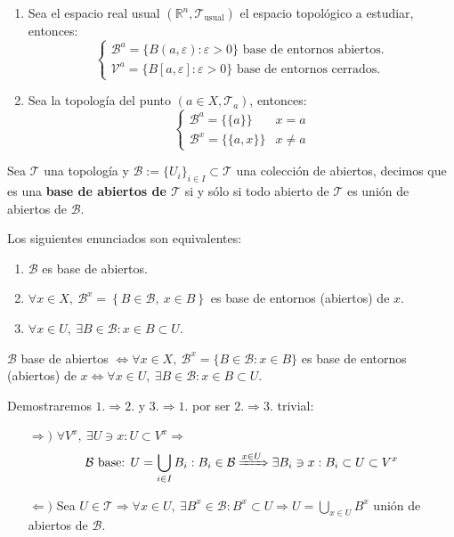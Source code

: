 \begin{ej}
\begin{enumerate}
    \item Sea el espacio real usual $(\mathbb{R}^n, \mathcal{T}_{\text{usual}})$ el espacio topológico a estudiar, entonces:
    $$
    \begin{cases}
    \mathcal{B}^a = \{B\left( a, \varepsilon \right): \varepsilon > 0\} \text{ base de entornos abiertos.}  \\
    \mathcal{V}^a = \{B\left[ a, \varepsilon \right]: \varepsilon > 0\} \text{ base de entornos cerrados.} 
    \end{cases} 
    $$
    \item Sea la topología del punto $(a \in X, \mathcal{T}_a)$, entonces:
	$$
	\begin{cases}
	\mathcal{B}^a = \{\{a\}\} & x = a\\
	\mathcal{B}^x = \{\{a, x\}\} & x \neq a
	\end{cases}
	$$
\end{enumerate}
\end{ej}

\begin{defi}
Sea $\mathcal{T}$ una topología y $\mathcal{B} :=\{U_i\}_{i\in I}\subset \mathcal{T}$ una colección de abiertos, decimos que es una \textbf{base de abiertos de $\mathcal{T}$} si y sólo si todo abierto de $\mathcal{T}$ es unión de abiertos de $\mathcal{B}$.
\end{defi}

\begin{prop}
Los siguientes enunciados son equivalentes:
\begin{enumerate}
\item $\mathcal{B}$ es base de abiertos. 
\item $\forall x \in X,\ \mathcal{B}^x = \left\{ B \in \mathcal{B},\ x \in B \right\}$ es base de entornos (abiertos) de $x$.
\item $\forall x \in U,\ \exists B \in \mathcal{B} : x \in B \subset U$.
\end{enumerate}
$\mathcal{B}$ base de abiertos $\Leftrightarrow \forall x \in X,\ \mathcal{B}^x = \{B \in \mathcal{B} : x \in B\}$ es base de entornos (abiertos) de $x \Leftrightarrow \forall x \in U,\ \exists B \in \mathcal{B} : x \in B \subset U$.
\end{prop}
\begin{demo}
Demostraremos $1. \Rightarrow 2.$ y $3. \Rightarrow 1.$ por ser $2. \Rightarrow 3.$ trivial:
\begin{itemize}
\item[$\Rightarrow)$] $\forall V^x,\ \exists U \ni x: U \subset V^x \Rightarrow$
\[
    \mathcal{B} \text{ base: } U = \bigcup_{i \in  I} B_i: B_i \in \mathcal{B} \xRightarrow{x \in U} \exists B_i \ni x: B_i \subset U \subset V^x
\]
\item[$\Leftarrow)$] Sea $U \in \mathcal{T} \Rightarrow \forall x \in U,\ \exists B^x \in \mathcal{B}: B^x \subset U \Rightarrow U = \bigcup_{x \in U} B^x$ unión de abiertos de $\mathcal{B}$.
\end{itemize}
\end{demo}

